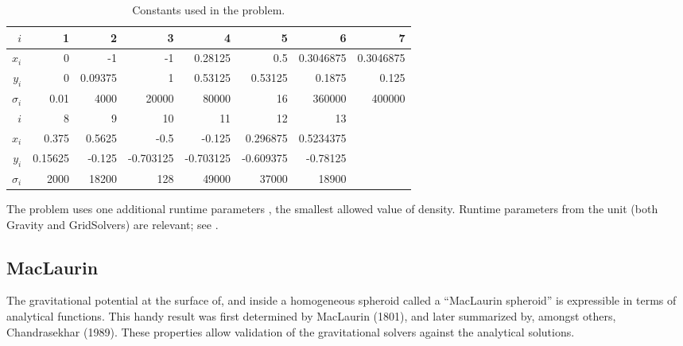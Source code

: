 \begin{table}[!ht]

\caption{ Constants used in the 
problem.}
\label{Tab:HG constants} 
\begin{center}
\begin{tabular}{|r|rrrrrrr|}
\hline
$i$       & 1        & 2       & 3       & 4        & 5       & 6       & 7\\
\hline
$x_i$     & 0        & -1      & -1      & 0.28125  & 0.5     & 0.3046875 &
  0.3046875\\
$y_i$     & 0        & 0.09375 & 1       & 0.53125  & 0.53125 & 0.1875  &
0.125\\
$\sigma_i$& 0.01     & 4000    & 20000   & 80000    & 16      & 360000  &
  400000\\
\hline
\hline
$i$       & 8        & 9       & 10      & 11       & 12      & 13 & \\
\hline
$x_i$     & 0.375    & 0.5625  & -0.5    & -0.125   & 0.296875 & 0.5234375 & \\
$y_i$     & 0.15625  & -0.125  & -0.703125 & -0.703125 & -0.609375 &
  -0.78125 & \\
$\sigma_i$& 2000     & 18200   & 128     & 49000    & 37000   & 18900 & \\
\hline
\end{tabular}
\end{center}

\end{table}

The  problem uses one additional runtime parameters 
, the smallest allowed value of density.  
Runtime parameters from the  unit (both Gravity and GridSolvers) are
relevant; see .

\subsection{MacLaurin}
\label{Sec:SimulationMacLaurin}
The gravitational potential at the surface of, and inside a homogeneous spheroid
called a ``MacLaurin spheroid'' is expressible in terms of analytical functions.
This handy result was first determined by MacLaurin (1801), and later summarized by,
amongst others, Chandrasekhar (1989).  These properties allow validation of 
the \flashx gravitational solvers against the analytical solutions.

